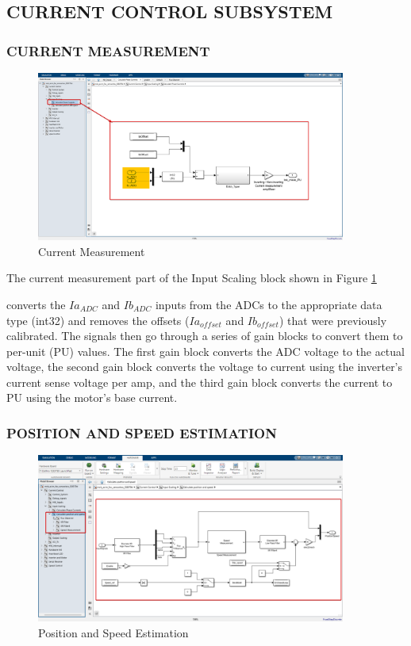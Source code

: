 \subsection{CURRENT CONTROL SUBSYSTEM}

\subsubsection{CURRENT MEASUREMENT}


\begin{figure}[H]
	\centering
	\includegraphics[width=4in]{sections/section3/images/simulation/inputScaling/currentMeasurement.png}
	\caption{Current Measurement}
	\label{fig:current_measurement}
\end{figure}


The current measurement part of the Input Scaling block shown in Figure \ref{fig:current_measurement}

converts the $Ia_{ADC}$ and $Ib_{ADC}$ inputs from the ADCs to the appropriate data type (int32) and removes the offsets ($Ia_{offset}$ and $Ib_{offset}$) that were previously calibrated. The signals then go through a series of gain blocks to convert them to per-unit (PU) values. The first gain block converts the ADC voltage to the actual voltage, the second gain block converts the voltage to current using the inverter's current sense voltage per amp, and the third gain block converts the current to PU using the motor's base current.


\subsubsection{POSITION AND SPEED ESTIMATION}



\begin{figure}[H]
	\centering
	\includegraphics[width=4in]{sections/section3/images/simulation/inputScaling/fluxObserver.png}
	\caption{Position and Speed Estimation}
	\label{fig:position_speed_estimation}
\end{figure}


